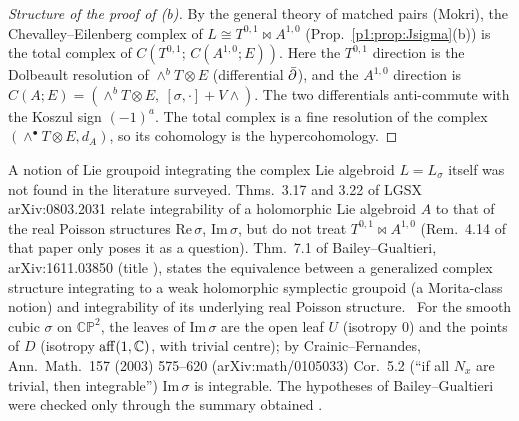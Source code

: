 \begin{proof}[Structure of the proof of (b)]
By the general theory of matched pairs (Mokri), the Chevalley--Eilenberg complex of $L\cong T^{0,1}\bowtie A^{1,0}$ (Prop.~\ref{p1:prop:Jsigma}(b)) is the total complex of $C(T^{0,1};\,C(A^{1,0};E))$. Here the $T^{0,1}$ direction is the Dolbeault resolution of $\wedge^bT\otimes E$ (differential $\bar\partial$), and the $A^{1,0}$ direction is $C(A;E)=(\wedge^bT\otimes E,\ [\sigma,\cdot]+V\wedge)$. The two differentials anti-commute with the Koszul sign $(-1)^a$. The total complex is a fine resolution of the complex $(\wedge^\bullet T\otimes E,d_A)$, so its cohomology is the hypercohomology.\qedhere
\end{proof}

\begin{rem}
A notion of Lie groupoid integrating the complex Lie algebroid $L=L_\sigma$ itself was not found in the literature surveyed. Thms.~3.17 and 3.22 of LGSX arXiv:0803.2031 relate integrability of a holomorphic Lie algebroid $A$ to that of the real Poisson structures $\mathrm{Re}\,\sigma$, $\mathrm{Im}\,\sigma$, but do not treat $T^{0,1}\bowtie A^{1,0}$ (Rem.~4.14 of that paper only poses it as a question). Thm.~7.1 of Bailey--Gualtieri, arXiv:1611.03850 (title \tQ), states the equivalence between a generalized complex structure integrating to a weak holomorphic symplectic groupoid (a Morita-class notion) and integrability of its underlying real Poisson structure. \tP\ For the smooth cubic $\sigma$ on $\mathbb{CP}^2$, the leaves of $\mathrm{Im}\,\sigma$ are the open leaf $U$ (isotropy $0$) and the points of $D$ (isotropy $\mathrm{aff}(1,\mathbb C)$, with trivial centre); by Crainic--Fernandes, Ann.\ Math.\ 157 (2003) 575--620 (arXiv:math/0105033) Cor.~5.2 (``if all $N_x$ are trivial, then integrable'') $\mathrm{Im}\,\sigma$ is integrable. The hypotheses of Bailey--Gualtieri were checked only through the summary obtained \tQ.
\end{rem}

